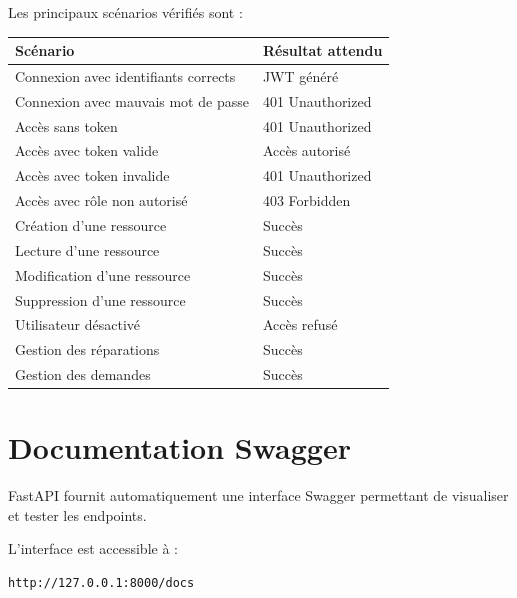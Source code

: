 \documentclass[12pt,a4paper]{report}
\begin{document}
Les principaux scénarios vérifiés sont :

\begin{center}
\begin{longtable}{p{7cm}p{4cm}}
\toprule
\textbf{Scénario} & \textbf{Résultat attendu} \\
\midrule
Connexion avec identifiants corrects & JWT généré \\
Connexion avec mauvais mot de passe & 401 Unauthorized \\
Accès sans token & 401 Unauthorized \\
Accès avec token valide & Accès autorisé \\
Accès avec token invalide & 401 Unauthorized \\
Accès avec rôle non autorisé & 403 Forbidden \\
Création d'une ressource & Succès \\
Lecture d'une ressource & Succès \\
Modification d'une ressource & Succès \\
Suppression d'une ressource & Succès \\
Utilisateur désactivé & Accès refusé \\
Gestion des réparations & Succès \\
Gestion des demandes & Succès \\
\bottomrule
\end{longtable}
\end{center}

\section{Documentation Swagger}

FastAPI fournit automatiquement une interface Swagger permettant de
visualiser et tester les endpoints.

L'interface est accessible à :

\begin{verbatim}
http://127.0.0.1:8000/docs
\end{verbatim}
\end{document}
